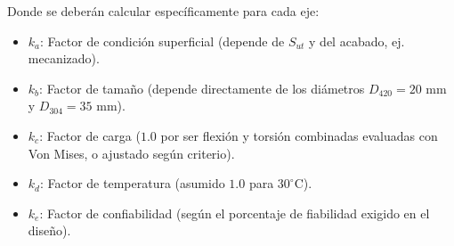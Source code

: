 \documentclass[12pt, a4paper]{article}
\begin{document}
Donde se deberán calcular específicamente para cada eje:
\begin{itemize}
    \item $k_a$: Factor de condición superficial (depende de $S_{ut}$ y del acabado, ej. mecanizado).
    \item $k_b$: Factor de tamaño (depende directamente de los diámetros $D_{420} = 20 \text{ mm}$ y $D_{304} = 35 \text{ mm}$).
    \item $k_c$: Factor de carga ($1.0$ por ser flexión y torsión combinadas evaluadas con Von Mises, o ajustado según criterio).
    \item $k_d$: Factor de temperatura (asumido $1.0$ para $30^\circ\text{C}$).
    \item $k_e$: Factor de confiabilidad (según el porcentaje de fiabilidad exigido en el diseño).
\end{itemize}
\end{document}
